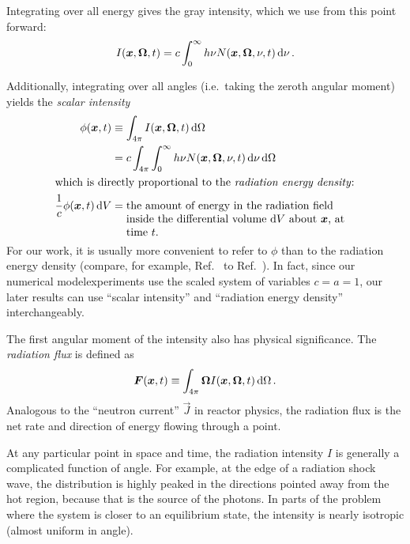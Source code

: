 Integrating over all energy gives the gray intensity, which we use from this point forward:
\begin{equation*}
  I(\bm{x},\bm{\Omega}, t)
  = c \int_0^\infty h\nu N(\bm{x},\bm{\Omega},\nu, t) \mathop{}\!\mathrm{d}\nu \,.
\end{equation*}

Additionally, integrating over all angles (i.e.~taking the zeroth angular
moment) yields the \emph{scalar intensity}
\begin{align} \label{eq:intensityZeroth}
  \phi(\vec{x},t) &\equiv \int_{4\pi} I(\vec{x},\vec{\Omega}, t) \ud \Omega
  \\
  &= c \int_{4\pi} \int_0^\infty h\nu N(\vec{x},\vec{\Omega},\nu, t) \ud\nu
   \ud \Omega
\\ \intertext{which is directly proportional to the \emph{radiation energy
density}:}
\nonumber
\frac{1}{c} \phi(\vec{x},t) \ud V
&= \topbox{the amount of energy in the radiation field inside the differential
  volume $\ud V$ about $\vec{x}$, at time $t$.}
\end{align}
For our work, it is usually more convenient to refer to $\phi$ than to the
radiation energy density (compare, for example, Ref.~\cite{Den2007} to
Ref.~\cite{Kno1999a}). In fact, since our numerical modelexperiments use the
scaled system of variables $c=a=1$, our later results can use ``scalar
intensity'' and ``radiation energy density'' interchangeably.

The first angular moment of the intensity also has physical significance. The
\emph{radiation flux} is defined as
\begin{equation} \label{eq:intensityFirst}
  \bm{F}(\bm{x},t) \equiv \int_{4\pi} \bm{\Omega}
  I(\bm{x},\bm{\Omega}, t) \mathop{}\!\mathrm{d} \Omega \,.
\end{equation}
Analogous to the ``neutron current'' $\vec{J}$ in reactor physics, the
radiation flux is the net rate and direction of energy flowing through a point.

At any particular point in space and time, the radiation intensity $I$ is
generally a complicated function of angle.
For example, at the edge of a
radiation shock wave, the distribution is highly peaked in the directions
pointed away from the hot region, because that is the source of the photons. In
parts of the problem where the system is closer to an equilibrium state,
the intensity is nearly isotropic (almost uniform in angle).

